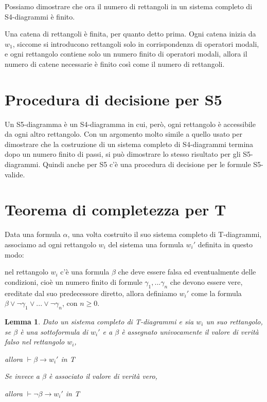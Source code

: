 \documentclass[a4paper, titlepage, 12pt]{report}
\newtheorem{lemma}{Lemma}[chapter]
\begin{document}
Possiamo dimostrare che ora il numero di rettangoli in un sistema
completo di S4-diagrammi è finito.

Una catena di rettangoli è finita, per quanto detto prima.
Ogni catena inizia da $w_1$, siccome si introducono rettangoli
solo in corrispondenza di operatori modali, e ogni rettangolo contiene solo un numero finito
di operatori modali, allora il numero di catene necessarie è finito
così come il numero di rettangoli.

\section{Procedura di decisione per S5}
Un S5-diagramma è un S4-diagramma in cui, però, ogni rettangolo è accessibile
da ogni altro rettangolo. Con un argomento molto simile a quello usato
per dimostrare che la costruzione di un sistema completo di S4-diagrammi termina dopo
un numero finito di passi, si può dimostrare lo stesso risultato per gli S5-diagrammi.
Quindi anche per S5 c'è una procedura di decisione per le formule S5-valide.


\section{Teorema di completezza per T}
Data una formula $\alpha$, una volta costruito il suo sistema completo di T-diagrammi,
associamo ad ogni rettangolo $w_i$ del sistema una formula $w_i'$ definita in questo modo:

nel rettangolo $w_i$ c'è una formula $\beta$ che deve essere falsa ed eventualmente delle condizioni,
cioè un numero finito di formule $\gamma_1, ...\gamma_n$ che devono essere vere, ereditate
dal suo predecessore diretto, allora definiamo $w_i'$ come la formula
$\beta \lor \neg \gamma_1 \lor ... \lor \neg \gamma_n$, con $n \geq 0$.

\begin{lemma} \label{LemmaImportante}
Dato un sistema completo di T-diagrammi e sia $w_i$ un suo rettangolo,
se $\beta$ è una sottoformula di $w_i'$ e a $\beta$ è assegnato univocamente il valore di verità falso
nel rettangolo $w_i$,

allora $\vdash \beta \rightarrow w_i'$ in T

Se invece a $\beta$ è associato il valore di verità vero,


allora $\vdash \neg \beta \rightarrow w_i'$ in T
\end{lemma}
\end{document}
